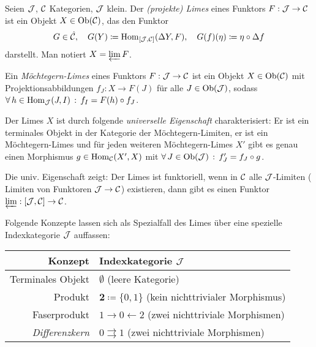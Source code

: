 \documentclass{cheat-sheet}
\begin{document}
\begin{defn}
  Seien $\mathcal{J}$, $\mathcal{C}$ Kategorien, $\mathcal{J}$ klein. Der \emph{(projekte) Limes} eines Funktors $F : \mathcal{J} \to \mathcal{C}$ ist ein Objekt $X \in \operatorname{Ob}(\mathcal{C})$, das den Funktor
  \[
    G \in \hat{\mathcal{C}}, \quad
    G(Y) \coloneqq \operatorname{Hom}_{[\mathcal{J}, \mathcal{C}]}(\Delta Y, F), \quad
    G(f)(\eta) \coloneqq \eta \circ \Delta f
  \]
  darstellt. Man notiert $X = \varprojlim F$.
\end{defn}


\begin{defn}
  Ein \emph{Möchtegern-Limes} eines Funktors $F : \mathcal{J} \to \mathcal{C}$ ist ein Objekt $X \in \operatorname{Ob}(\mathcal{C})$ mit 
  Projektionsabbildungen $f_J : X \to F(J)$ für alle $J \in \operatorname{Ob}(\mathcal{J})$, sodass
  $\forall \, {h \in \operatorname{Hom}_{\mathcal{J}}(J, I)} \,:\, f_I = F(h) \circ f_J$.
\end{defn}

\begin{bem}
  Der Limes $X$ ist durch folgende \emph{universelle Eigenschaft} charakterisiert:
  Er ist ein terminales Objekt in der Kategorie der Möchtegern-Limiten, \dh{} er ist ein Möchtegern-Limes und für jeden weiteren Möchtegern-Limes $X'$ gibt es genau einen Morphismus $g \in \operatorname{Hom}_{\mathcal{C}}(X', X)$ mit
  $\forall \, {J \in \operatorname{Ob}(\mathcal{J})} \,:\, f'_J = f_J \circ g$.
\end{bem}

\begin{bem}
  Die univ. Eigenschaft zeigt: Der Limes ist funktoriell, \dh{} wenn in $\mathcal{C}$ alle $\mathcal{J}$-Limiten (\dh{} Limiten von Funktoren $\mathcal{J} \to \mathcal{C}$) existieren, dann gibt es einen Funktor $\varprojlim : [\mathcal{J}, \mathcal{C}] \to \mathcal{C}$.
\end{bem}

\begin{bem}
  Folgende Konzepte lassen sich als Spezialfall des Limes über eine spezielle Indexkategorie $\mathcal{J}$ auffassen:
  \begin{center}
    \begin{tabular}{ | r | l | }
      \hline
      Konzept & Indexkategorie $\mathcal{J}$ \\ \hline
      Terminales Objekt & $\emptyset$ (leere Kategorie) \\
      Produkt & $\mathbf{2} \coloneqq \{ 0, 1 \}$ (kein nichttrivialer Morphismus) \\
      Faserprodukt & $1 \to 0 \leftarrow 2$ (zwei nichttriviale Morphismen) \\
      \emph{Differenzkern} &  $0 \rightrightarrows 1$ (zwei nichttriviale Morphismen) \\ \hline
    \end{tabular}
  \end{center}
\end{bem}
\end{document}
